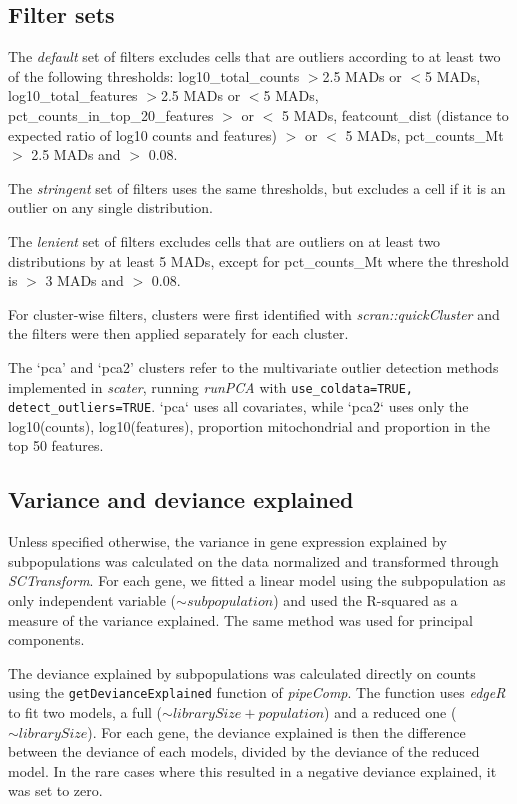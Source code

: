 \documentclass{bmcart}
\begin{document}
\subsection*{Filter sets}
The \textit{default} set of filters excludes cells that are outliers according to at least two of the following thresholds: log10\_total\_counts $>$2.5 MADs or $<$5 MADs, log10\_total\_features $>$2.5 MADs or $<$5 MADs, pct\_counts\_in\_top\_20\_features $>$ or $<$ 5 MADs, featcount\_dist (distance to expected ratio of log10 counts and features) $>$ or $<$ 5 MADs, pct\_counts\_Mt $>$ 2.5 MADs and $>$ 0.08.

The \textit{stringent} set of filters uses the same thresholds, but excludes a cell if it is an outlier on any single distribution. 

The \textit{lenient} set of filters excludes cells that are outliers on at least two distributions by at least 5 MADs, except for pct\_counts\_Mt where the threshold is $>$ 3 MADs and $>$ 0.08.

For cluster-wise filters, clusters were first identified with \textit{scran::quickCluster} and the filters were then applied separately for each cluster. 

The `pca' and `pca2' clusters refer to the multivariate outlier detection methods implemented in \textit{scater}, running \textit{runPCA} with \texttt{use\_coldata=TRUE, detect\_outliers=TRUE}. `pca` uses all covariates, while `pca2` uses only the log10(counts), log10(features), proportion mitochondrial and proportion in the top 50 features.

\subsection*{Variance and deviance explained}

Unless specified otherwise, the variance in gene expression explained by subpopulations was calculated on the data normalized and transformed through \textit{SCTransform}. For each gene, we fitted a linear model using the subpopulation as only independent variable ($\sim subpopulation$) and used the R-squared as a measure of the variance explained. The same method was used for principal components.

The deviance explained by subpopulations was calculated directly on counts using the \linebreak \texttt{getDevianceExplained} function of \textit{pipeComp}. The function uses \textit{edgeR} to fit two models, a full ($\sim librarySize + population$) and a reduced one ($\sim librarySize$). For each gene, the deviance explained is then the difference between the deviance of each models, divided by the deviance of the reduced model. In the rare cases where this resulted in a negative deviance explained, it was set to zero.
\end{document}
